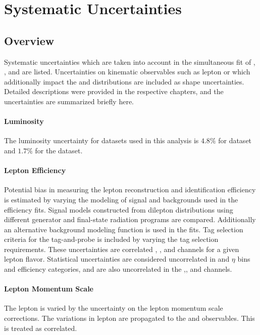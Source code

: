 \chapter{Systematic Uncertainties}

\section{Overview}
Systematic uncertainties which are taken into account in the simultaneous fit of \Wp, \Wm, and \Z are listed. Uncertainties on kinematic observables such as lepton \pt or \met which additionally impact the \mt and \mll distributions are included as shape uncertainties. Detailed descriptions were provided in the respective chapters, and the uncertainties are summarized briefly here.

\subsubsection{Luminosity}
The luminosity uncertainty for datasets used in this analysis is $4.8\%$ for \serag dataset and $1.7\%$ for the \serah dataset. 

\subsubsection{Lepton Efficiency}
Potential bias in measuring the lepton reconstruction and identification efficiency is estimated by varying the modeling of signal and backgrounds used in the efficiency  fits. Signal models constructed from dilepton \mll distributions using different generator and final-state radiation programs are compared. Additionally an alternative background modeling function is used in the fits. Tag selection criteria for the tag-and-probe is included by varying the tag selection requirements. These uncertainties are correlated \Wp, \Wm, and \Z channels for a given lepton flavor. Statistical uncertainties are considered uncorrelated in \pt and $\eta$ bins and efficiency categories, and are also uncorrelated in the \Wp,\Wm, and \Z channels.

\subsubsection{Lepton Momentum Scale}
The lepton \pt is varied by the uncertainty on the lepton momentum scale corrections. The variations in lepton \pt are propagated to the \mt and \mll observables. This is treated as correlated.

